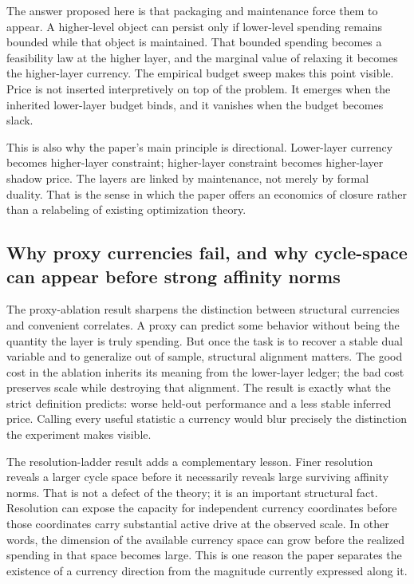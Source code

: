 The answer proposed here is that packaging and maintenance force them to appear. A higher-level object can persist only if lower-level spending remains bounded while that object is maintained. That bounded spending becomes a feasibility law at the higher layer, and the marginal value of relaxing it becomes the higher-layer currency. The empirical budget sweep makes this point visible. Price is not inserted interpretively on top of the problem. It emerges when the inherited lower-layer budget binds, and it vanishes when the budget becomes slack.

This is also why the paper's main principle is directional. Lower-layer currency becomes higher-layer constraint; higher-layer constraint becomes higher-layer shadow price. The layers are linked by maintenance, not merely by formal duality. That is the sense in which the paper offers an economics of closure rather than a relabeling of existing optimization theory.

\subsection{Why proxy currencies fail, and why cycle-space can appear before strong affinity norms}

The proxy-ablation result sharpens the distinction between structural currencies and convenient correlates. A proxy can predict some behavior without being the quantity the layer is truly spending. But once the task is to recover a stable dual variable and to generalize out of sample, structural alignment matters. The good cost in the ablation inherits its meaning from the lower-layer ledger; the bad cost preserves scale while destroying that alignment. The result is exactly what the strict definition predicts: worse held-out performance and a less stable inferred price. Calling every useful statistic a currency would blur precisely the distinction the experiment makes visible.

The resolution-ladder result adds a complementary lesson. Finer resolution reveals a larger cycle space before it necessarily reveals large surviving affinity norms. That is not a defect of the theory; it is an important structural fact. Resolution can expose the capacity for independent currency coordinates before those coordinates carry substantial active drive at the observed scale. In other words, the dimension of the available currency space can grow before the realized spending in that space becomes large. This is one reason the paper separates the existence of a currency direction from the magnitude currently expressed along it.

